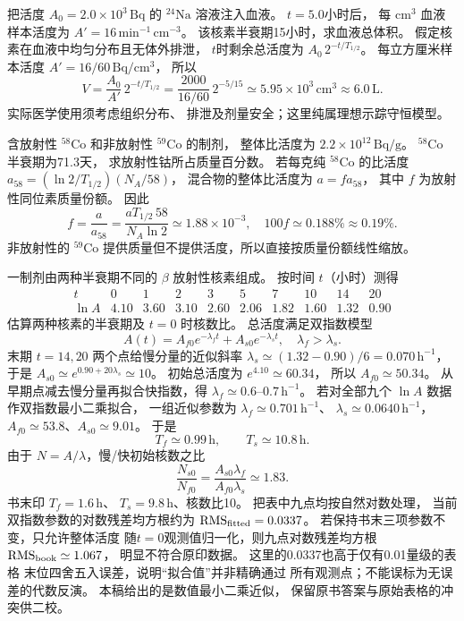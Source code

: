 把活度 $A_0=2.0\times10^3\,\mathrm{Bq}$
的 $\mathrm{^{24}Na}$ 溶液注入血液。
$t=5.0$小时后，
每 $\mathrm{cm^3}$ 血液样本活度为
$A'=16\,\mathrm{min^{-1}\,cm^{-3}}$。
该核素半衰期15小时，求血液总体积。
\exsolution
假定核素在血液中均匀分布且无体外排泄，
$t$时剩余总活度为
$A_0\,2^{-t/T_{1/2}}$。
每立方厘米样本活度
$A'=16/60\,\mathrm{Bq/cm^3}$，
所以
\[
 \boxed{V=\frac{A_0}{A'}\,2^{-t/T_{1/2}}
 =\frac{2000}{16/60}\,2^{-5/15}
 \simeq5.95\times10^3\,\mathrm{cm^3}
 \approx6.0\,\mathrm L}.
\]
\excheck 实际医学使用须考虑组织分布、
排泄及剂量安全；这里纯属理想示踪守恒模型。

含放射性 $\mathrm{^{58}Co}$ 和非放射性
$\mathrm{^{59}Co}$ 的制剂，
整体比活度为
$2.2\times10^{12}\,\mathrm{Bq/g}$。
$\mathrm{^{58}Co}$ 半衰期为71.3天，
求放射性钴所占质量百分数。
\exsolution
若每克纯 $\mathrm{^{58}Co}$ 的比活度
$a_{58}=(\ln2/T_{1/2})(N_A/58)$，
混合物的整体比活度为 $a=f a_{58}$，
其中 $f$ 为放射性同位素质量份额。
因此
\[
 \boxed{f=\frac{a}{a_{58}}
 =\frac{aT_{1/2}\,58}{N_A\ln2}
 \simeq1.88\times10^{-3}},
 \quad \boxed{100f\simeq0.188\%\approx0.19\%}.
\]
\excheck 非放射性的 $\mathrm{^{59}Co}$
提供质量但不提供活度，所以直接按质量份额线性缩放。

一制剂由两种半衰期不同的 $\beta$ 放射性核素组成。
按时间 $t$（小时）测得
\[
\begin{array}{c|rrrrrrrrr}
t&0&1&2&3&5&7&10&14&20\\\hline
\ln A&4.10&3.60&3.10&2.60&2.06&1.82&1.60&1.32&0.90
\end{array}
\]
估算两种核素的半衰期及 $t=0$ 时核数比。
\exsolution
总活度满足双指数模型
\[
 A(t)=A_{f0}e^{-\lambda_f t}
 +A_{s0}e^{-\lambda_s t},\quad\lambda_f>\lambda_s.
\]
末期 $t=14,20$ 两个点给慢分量的近似斜率
$\lambda_s\simeq(1.32-0.90)/6=0.070\,\mathrm{h^{-1}}$，
于是 $A_{s0}\simeq e^{0.90+20\lambda_s}\simeq10$。
初始总活度为 $e^{4.10}\simeq60.34$，
所以 $A_{f0}\simeq50.34$。
从早期点减去慢分量再拟合快指数，得
$\lambda_f\simeq0.6$--$0.7\,\mathrm{h^{-1}}$。
若对全部九个 $\ln A$ 数据作双指数最小二乘拟合，
一组近似参数为
$\lambda_f\simeq0.701\,\mathrm{h^{-1}}$、
$\lambda_s\simeq0.0640\,\mathrm{h^{-1}}$，
$A_{f0}\simeq53.8$、$A_{s0}\simeq9.01$。
于是
\[
 \boxed{T_f\simeq0.99\,\mathrm h,\qquad
 T_s\simeq10.8\,\mathrm h}.
\]
由于 $N=A/\lambda$，慢/快初始核数之比
\[
 \boxed{\frac{N_{s0}}{N_{f0}}=
 \frac{A_{s0}\lambda_f}{A_{f0}\lambda_s}
 \simeq1.83}.
\]
\excheck 书末印 $T_f=1.6\,\mathrm h$、
$T_s=9.8\,\mathrm h$、核数比10。
把表中九点均按自然对数处理，
当前双指数参数的对数残差均方根约为
$\mathrm{RMS}_{\rm fitted}=0.0337$。
若保持书末三项参数不变，只允许整体活度
随$t=0$观测值归一化，则九点对数残差均方根
$\mathrm{RMS}_{\rm book}\simeq1.067$，
明显不符合原印数据。
这里的0.0337也高于仅有0.01量级的表格
末位四舍五入误差，说明“拟合值”并非精确通过
所有观测点；不能误标为无误差的代数反演。
本稿给出的是数值最小二乘近似，
保留原书答案与原始表格的冲突供二校。

